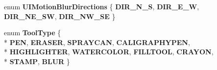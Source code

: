 \begin{DoxyCompactItemize}
\item 
enum {\bfseries U\+I\+Motion\+Blur\+Directions} \{ {\bfseries D\+I\+R\+\_\+\+N\+\_\+S}, 
{\bfseries D\+I\+R\+\_\+\+E\+\_\+W}, 
{\bfseries D\+I\+R\+\_\+\+N\+E\+\_\+\+SW}, 
{\bfseries D\+I\+R\+\_\+\+N\+W\+\_\+\+SE}
 \}\hypertarget{classFlashPhotoApp_a3aedac4056fe1e7836cde2e4986de312}{}\label{classFlashPhotoApp_a3aedac4056fe1e7836cde2e4986de312}

\item 
enum {\bfseries Tool\+Type} \{ \\*
{\bfseries P\+EN}, 
{\bfseries E\+R\+A\+S\+ER}, 
{\bfseries S\+P\+R\+A\+Y\+C\+AN}, 
{\bfseries C\+A\+L\+I\+G\+R\+A\+P\+H\+Y\+P\+EN}, 
\\*
{\bfseries H\+I\+G\+H\+L\+I\+G\+H\+T\+ER}, 
{\bfseries W\+A\+T\+E\+R\+C\+O\+L\+OR}, 
{\bfseries F\+I\+L\+L\+T\+O\+OL}, 
{\bfseries C\+R\+A\+Y\+ON}, 
\\*
{\bfseries S\+T\+A\+MP}, 
{\bfseries B\+L\+UR}
 \}\hypertarget{classFlashPhotoApp_aefa599903c439e7def0e3c95263111f1}{}\label{classFlashPhotoApp_aefa599903c439e7def0e3c95263111f1}

\end{DoxyCompactItemize}
